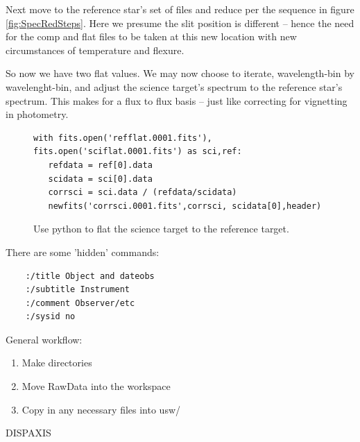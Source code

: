 Next move to the reference star's set of files and reduce per the
sequence in figure \ref{fig:SpecRedSteps}. Here we presume the slit
position is different -- hence the need for the comp and flat files to
be taken at this new location with new circumstances of temperature
and flexure.

So now we have two flat values. We may now choose to iterate,
wavelength-bin by wavelenght-bin, and adjust the science target's
spectrum to the reference star's spectrum. This makes for a flux to
flux basis -- just like correcting for vignetting in photometry.

\begin{figure}
\begingroup \fontsize{10pt}{10pt}
\selectfont
{\color{darkred}
\begin{verbatim} 
with fits.open('refflat.0001.fits'), fits.open('sciflat.0001.fits') as sci,ref:
   refdata = ref[0].data
   scidata = sci[0].data
   corrsci = sci.data / (refdata/scidata)
   newfits('corrsci.0001.fits',corrsci, scidata[0],header)
\end{verbatim}
} %
\endgroup
\caption{Use python to flat the science target to the reference target.}
\label{fig:FlatSciRef}
\end{figure}

There are some 'hidden' commands:

\begingroup \fontsize{10pt}{10pt}
\selectfont
\begin{verbatim} 
    :/title Object and dateobs
    :/subtitle Instrument
    :/comment Observer/etc
    :/sysid no
\end{verbatim}
\endgroup


General workflow:
\vspace{-.15cm}
\begin{enumerate}\addtolength{\itemsep}{-0.5\baselineskip}
   \item   Make directories
   \item   Move RawData into the workspace
   \item   Copy in any necessary files into usw/
\end{enumerate}


DISPAXIS

